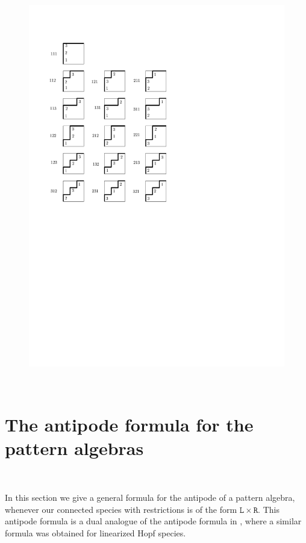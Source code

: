 \documentclass[12pt, reqno]{amsart}
\theoremstyle{definition}
\begin{document}
\begin{figure}
\centering
\includegraphics[scale=1]{images/parking_functions_3}
\caption{\label{fig:PF3}}
\end{figure}





\

\section{The antipode formula for the pattern algebras \label{sec:formula_general}}
\

In this section we give a general formula for the antipode of a pattern algebra, whenever our connected species with restrictions is of the form $\mathtt{L} \times \mathtt{R}$. This antipode formula is a dual analogue of the antipode formula in \cite{BergeronBenedetti}, where a similar formula was obtained for linearized Hopf species.
\end{document}
